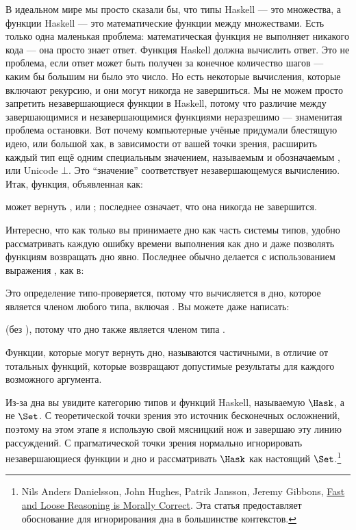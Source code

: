 В идеальном мире мы просто сказали бы, что типы Haskell --- это множества, а
функции Haskell --- это математические функции между множествами. Есть только
одна маленькая проблема: математическая функция не выполняет никакого кода
--- она просто знает ответ. Функция Haskell должна вычислить
ответ. Это не проблема, если ответ может быть получен за конечное
количество шагов --- каким бы большим ни было это число. Но есть некоторые
вычисления, которые включают рекурсию, и они могут никогда не завершиться. Мы
не можем просто запретить незавершающиеся функции в Haskell, потому что
различие между завершающимися и незавершающимися функциями
неразрешимо --- знаменитая проблема остановки. Вот почему компьютерные
учёные придумали блестящую идею, или большой хак, в зависимости от
вашей точки зрения, расширить каждый тип ещё одним специальным значением,
называемым  и обозначаемым \code{\_|\_}, или
Unicode $\bot$. Это ``значение'' соответствует незавершающемуся вычислению.
Итак, функция, объявленная как:

может вернуть ,  или \code{\_|\_};
последнее означает, что она никогда не завершится.

Интересно, что как только вы принимаете дно как часть системы типов, удобно
рассматривать каждую ошибку времени выполнения как дно и даже позволять
функциям возвращать дно явно. Последнее обычно делается
с использованием выражения , как в:

Это определение типо-проверяется, потому что  вычисляется в
дно, которое является членом любого типа, включая . Вы можете
даже написать:

(без ), потому что дно также является членом типа
.

Функции, которые могут вернуть дно, называются частичными, в отличие от тотальных
функций, которые возвращают допустимые результаты для каждого возможного аргумента.

Из-за дна вы увидите категорию типов и функций Haskell,
называемую $\Hask$, а не $\Set$. С
теоретической точки зрения это источник бесконечных
осложнений, поэтому на этом этапе я использую свой мясницкий нож и
завершаю эту линию рассуждений. С прагматической точки зрения
нормально игнорировать незавершающиеся функции и дно и рассматривать
$\Hask$ как настоящий $\Set$.\footnote{Nils Anders Danielsson,
  John Hughes, Patrik Jansson, Jeremy Gibbons, \href{http://www.cs.ox.ac.uk/jeremy.gibbons/publications/fast+loose.pdf}{
    Fast and Loose Reasoning is Morally Correct}. Эта статья предоставляет обоснование для игнорирования дна в большинстве контекстов.}

